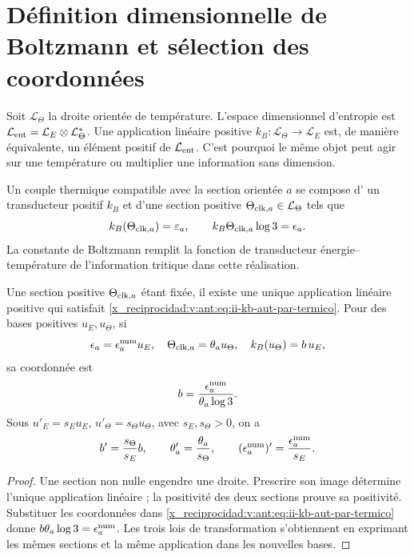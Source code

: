 \section{Définition dimensionnelle de Boltzmann et sélection des coordonnées}

Soit \(\mathcal L_\Theta\) la droite orientée de température. L'espace dimensionnel d'entropie est \(\mathcal L_{\rm ent}=\mathcal L_E\otimes\mathcal L_\Theta^*\). Une application linéaire positive \(k_B:\mathcal L_\Theta\to\mathcal L_E\) est, de manière équivalente, un élément positif de \(\mathcal L_{\rm ent}\). C'est pourquoi le même objet peut agir sur une température ou multiplier une information sans dimension.

\begin{definition}
Un couple thermique compatible avec la section orientée \(a\) se compose d'
un transducteur positif \(k_B\) et d'une section positive
\(\Theta_{{\rm clk},a}\in\mathcal L_\Theta\) tels que
\begin{equation}
 k_B(\Theta_{{\rm clk},a})=\varepsilon_a,
 \qquad
 k_B\Theta_{{\rm clk},a}\log3=\epsilon_a.
 \label{x_reciprocidad:v:ant:eq:ii-kb-aut-par-termico}
\end{equation}
La constante de Boltzmann remplit la fonction de transducteur
énergie--température de l'information tritique dans cette réalisation.
\end{definition}

\begin{theorem}
Une section positive \(\Theta_{{\rm clk},a}\) étant fixée, il existe une unique application linéaire positive qui satisfait \eqref{x_reciprocidad:v:ant:eq:ii-kb-aut-par-termico}. Pour des bases positives \(u_E,u_\Theta\), si
\[
 \epsilon_a=\epsilon_a^{\rm num}u_E,\quad
 \Theta_{{\rm clk},a}=\theta_a u_\Theta,\quad
 k_B(u_\Theta)=b\,u_E,
\]
sa coordonnée est
\begin{equation}
 b=\frac{\epsilon_a^{\rm num}}{\theta_a\log3}.
 \label{x_reciprocidad:v:ant:eq:ii-kb-aut-coordenada}
\end{equation}
Sous \(u'_E=s_Eu_E\), \(u'_\Theta=s_\Theta u_\Theta\), avec
\(s_E,s_\Theta>0\), on a
\[
 b'=\frac{s_\Theta}{s_E}b,\qquad
 \theta'_a=\frac{\theta_a}{s_\Theta},\qquad
 (\epsilon_a^{\rm num})'=\frac{\epsilon_a^{\rm num}}{s_E}.
\]
\end{theorem}
\begin{proof}
Une section non nulle engendre une droite. Prescrire son image détermine
l'unique application linéaire ; la positivité des deux sections prouve
sa positivité. Substituer les coordonnées dans
\eqref{x_reciprocidad:v:ant:eq:ii-kb-aut-par-termico} donne
\(b\theta_a\log3=\epsilon_a^{\rm num}\). Les trois lois de
transformation s'obtiennent en exprimant les mêmes sections et la même
application dans les nouvelles bases.
\end{proof}

